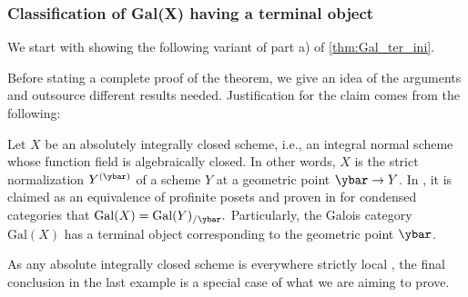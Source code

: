 \documentclass[leqno]{article}
\renewcommand{\Gal}{\mathrm{Gal}}
\begin{document}
\subsubsection{Classification of Gal(X) having a terminal object}
We start with showing the following variant of part a) of \cref{thm:Gal_ter_ini}.
%
Before stating a complete proof of the theorem, we give an idea of the arguments and outsource different results needed.
Justification for the claim comes from the following: 
\begin{example}
Let $X$ be an absolutely integrally closed scheme, i.e., an integral normal scheme whose function field is algebraically closed.
In other words, $X$ is the strict normalization $Y^{(\ybar)}$ of a scheme $Y$ at a geometric point $\ybar\rightarrow Y$. 
In \cite[Corollary~12.4.5]{Exodromy}, it is claimed as an equivalence of profinite posets and proven in \cite[Corollary 6.17]{The_condensed_homotopy_type} for condensed categories that
$\Gal(X)=\Gal(Y)_{/\ybar}.$
Particularly, the Galois category $\Gal(X)$ has a terminal object corresponding to the geometric point $\ybar$.
\end{example}
%
As any absolute integrally closed scheme is everywhere strictly local \cite[Proposition 2.6]{MR3649361}, the final conclusion in the last example is a special case of what we are aiming to prove.
\end{document}
